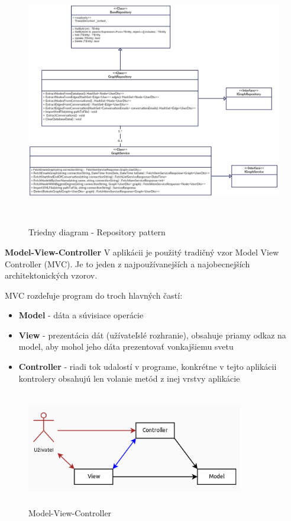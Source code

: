 \documentclass[slovak,master,public,dept460,male,cpdeclaration,oneside]{diploma}
\begin{document}
\begin{figure}[H]
\centering
\includegraphics[width=12cm, height=11cm]{figures/diagram_class}
\caption{Triedny diagram - Repository pattern}
\end{figure}



\textbf{Model-View-Controller}
V aplikácii je použitý tradičný vzor Model View Controller (MVC). Je to jeden z najpoužívanejších a najobecnejších architektonických vzorov. 

MVC rozdeľuje program do troch hlavných častí:
\begin{itemize}
\item \textbf{Model} - dáta a súvisiace operácie 
\item \textbf{View} - prezentácia dát (užívateľslé rozhranie), obsahuje priamy odkaz na model, aby mohol jeho dáta prezentovať vonkajšiemu svetu
\item \textbf{Controller} - riadi tok udalostí v programe, konkrétne v tejto aplikácii kontrolery obsahujú len volanie metód z inej vrstvy aplikácie
\end{itemize}

\begin{figure}[H]
\centering
\includegraphics[width=9.5cm, height=5cm]{figures/MVC}
\caption{Model-View-Controller}
\end{figure}
\end{document}
